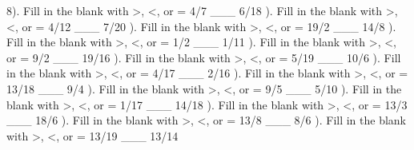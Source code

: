 \documentclass{article}%
\begin{document}
8). Fill in the blank with >, <, or = 4/7 \_\_\_ 6/18%
\newline%
\newline%
). Fill in the blank with >, <, or = 4/12 \_\_\_ 7/20%
\newline%
\newline%
). Fill in the blank with >, <, or = 19/2 \_\_\_ 14/8%
\newline%
\newline%
). Fill in the blank with >, <, or = 1/2 \_\_\_ 1/11%
\newline%
\newline%
). Fill in the blank with >, <, or = 9/2 \_\_\_ 19/16%
\newline%
\newline%
). Fill in the blank with >, <, or = 5/19 \_\_\_ 10/6%
\newline%
\newline%
). Fill in the blank with >, <, or = 4/17 \_\_\_ 2/16%
\newline%
\newline%
). Fill in the blank with >, <, or = 13/18 \_\_\_ 9/4%
\newline%
\newline%
). Fill in the blank with >, <, or = 9/5 \_\_\_ 5/10%
\newline%
\newline%
). Fill in the blank with >, <, or = 1/17 \_\_\_ 14/18%
\newline%
\newline%
). Fill in the blank with >, <, or = 13/3 \_\_\_ 18/6%
\newline%
\newline%
). Fill in the blank with >, <, or = 13/8 \_\_\_ 8/6%
\newline%
\newline%
). Fill in the blank with >, <, or = 13/19 \_\_\_ 13/14%
\newline%
\newline%
\end{document}

